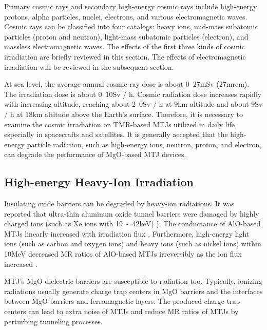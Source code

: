 \documentclass[molecules,review,submit,pdftex,moreauthors]{Definitions/mdpi}
\begin{document}
Primary cosmic rays and secondary high-energy cosmic rays include high-energy protons, alpha particles, nuclei, electrons, and various electromagnetic waves.  Cosmic rays can be classified into four catalogs: heavy ions, mid-mass subatomic particles (proton and neutron), light-mass subatomic particles (electron), and massless electromagnetic waves. The effects of the first three kinds of cosmic irradiation are briefly reviewed in this section.  The effects of electromagnetic irradiation will be reviewed in the subsequent section.  


At sea level, the average annual cosmic ray dose is about \unit{0.27}{mSv} (\unit{27}{mrem}).  The irradiation dose is about \unit{0.10}{\micro Sv / h}.  Cosmic radiation dose increases rapidly with increasing altitude, reaching about \unit{2.0}{\micro Sv / h} at \unit{9}{km} altitude and about \unit{9}{\micro Sv / h} at \unit{18}{km} altitude above the Earth's surface.  Therefore, it is necessary to examine the cosmic irradiation on TMR-based MTJs utilized in daily life, especially in spacecrafts and satellites.
It is generally accepted that the high-energy particle radiation, such as high-energy ions, neutron, proton, and electron, can degrade the performance of MgO-based MTJ devices.  


\subsection{High-energy Heavy-Ion Irradiation}


Insulating oxide barriers can be degraded by heavy-ion radiations.  It was reported that ultra-thin aluminum oxide tunnel barriers were damaged by highly charged ions (such as Xe ions with \unit{19 - 42}{keV})  \cite{Pomeroy2011NIMPRSb,Pomeroy2011NIMPRSb}).  The  conductance of AlO-based MTJs linearly increased with irradiation flux \cite{Pomeroy2007NIMPRSb}.  Furthermore, high-energy light ions (such as carbon and oxygen ions) and heavy ions (such as nickel ions) within \unit{10}{MeV} decreased MR ratios of AlO-based MTJs irreversibly as the ion flux increased \cite{Conraux2003JAP}.  


MTJ's MgO dielectric barriers are susceptible to radiation too.  Typically, ionizing radiations usually generate charge trap centers in MgO barriers and the interfaces between MgO barriers and ferromagnetic layers.  The produced charge-trap centers can lead to extra noise of MTJs \cite{Nowak1999APL} and reduce MR ratios of MTJs \cite{Moodera1999ARMS} by perturbing tunneling processes.  
\end{document}
